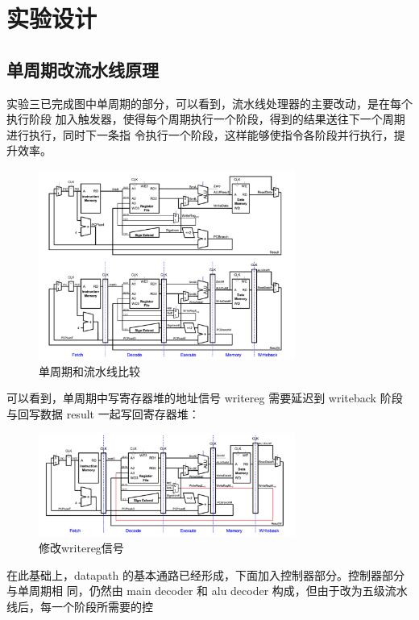 \section{实验设计}
\subsection{单周期改流水线原理}
实验三已完成图中单周期的部分，可以看到，流水线处理器的主要改动，是在每个执行阶段
加入触发器，使得每个周期执行一个阶段，得到的结果送往下一个周期进行执行，同时下一条指
令执行一个阶段，这样能够使指令各阶段并行执行，提升效率。
\begin{figure}[H]
	\centering
	\includegraphics[width=0.75\textwidth]{figure/单周期和流水线比较.png}
	\caption{单周期和流水线比较}
	\label{fig:single_cycle_pipeline}
\end{figure}
可以看到，单周期中写寄存器堆的地址信号 writereg 需要延迟到 writeback 阶段与回写数据
result 一起写回寄存器堆：
\begin{figure}[H]
	\centering
	\includegraphics[width=0.75\textwidth]{figure/修改writereg信号.png}
	\caption{修改writereg信号}
	\label{fig:modify_writereg}
\end{figure}
在此基础上，datapath 的基本通路已经形成，下面加入控制器部分。控制器部分与单周期相
同，仍然由 main decoder 和 alu decoder 构成，但由于改为五级流水线后，每一个阶段所需要的控
